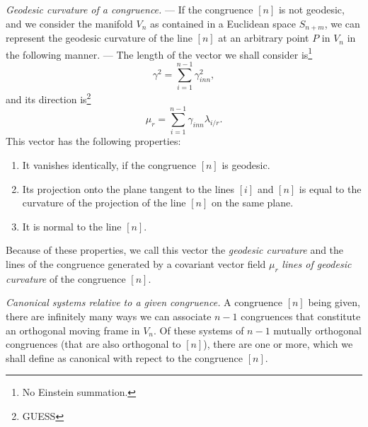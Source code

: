 \documentclass{book}
\begin{document}
\emph{Geodesic curvature of a congruence.} --- If the congruence $[n]$ is not geodesic, and we consider the manifold $V_n$ as contained in a Euclidean space $S_{n+m}$, we can represent the geodesic curvature of the line $[n]$ at an arbitrary point $P$ in $V_n$ in the following manner. --- The length of the vector we shall consider is\footnote{No Einstein summation.}
$$\gamma^2=\sum_{i=1}^{n-1}\gamma^2_{inn},$$
and its direction is\footnote{GUESS} 
$$\mu_r=\sum_{i=1}^{n-1}\gamma_{inn}\lambda_{i/r}.$$
This vector has the following properties:
\begin{enumerate}
	\item It vanishes identically, if the congruence $[n]$ is geodesic. 
	\item Its projection onto the plane tangent to the lines $[i]$ and $[n]$ is equal to the curvature of the projection of the line $[n]$ on the same plane.
	\item It is normal to the line $[n]$.
\end{enumerate}

Because of these properties, we call this vector the \emph{geodesic curvature} and the lines of the congruence generated by a covariant vector field $\mu_r$ \emph{lines of geodesic curvature} of the congruence $[n]$.

\emph{Canonical systems relative to a given congruence.} A congruence $[n]$ being given, there are infinitely many ways we can associate $n-1$ congruences that constitute an orthogonal moving frame in $V_n$. Of these systems of $n-1$ mutually orthogonal congruences (that are also orthogonal to $[n]$), there are one or more, which we shall define as canonical with repect to the congruence $[n]$. 
\end{document}
